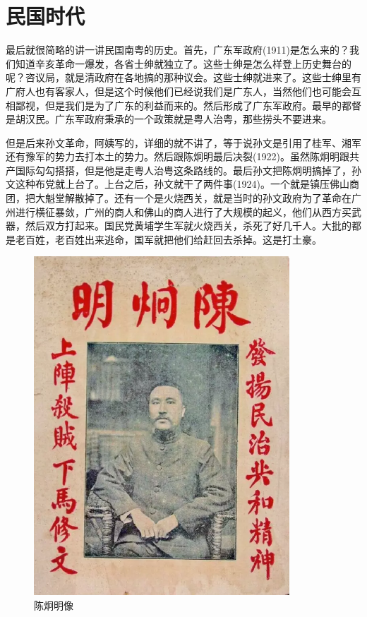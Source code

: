 \section{民国时代}

最后就很简略的讲一讲民国南粤的历史。首先，广东军政府(1911)是怎么来的？我们知道辛亥革命一爆发，各省士绅就独立了。这些士绅是怎么样登上历史舞台的呢？咨议局，就是清政府在各地搞的那种议会。这些士绅就进来了。这些士绅里有广府人也有客家人，但是这个时候他们已经说我们是广东人，当然他们也可能会互相鄙视，但是我们是为了广东的利益而来的。然后形成了广东军政府。最早的都督是胡汉民。广东军政府秉承的一个政策就是粤人治粤，那些捞头不要进来。

但是后来孙文革命，阿姨写的，详细的就不讲了，等于说孙文是引用了桂军、湘军还有豫军的势力去打本土的势力。然后跟陈炯明最后决裂(1922)。虽然陈炯明跟共产国际勾勾搭搭，但是他是走粤人治粤这条路线的。最后孙文把陈炯明搞掉了，孙文这种布党就上台了。上台之后，孙文就干了两件事(1924)。一个就是镇压佛山商团，把大魁堂解散掉了。还有一个是火烧西关，就是当时的孙文政府为了革命在广州进行横征暴敛，广州的商人和佛山的商人进行了大规模的起义，他们从西方买武器，然后双方打起来。国民党黄埔学生军就火烧西关，杀死了好几千人。大批的都是老百姓，老百姓出来逃命，国军就把他们给赶回去杀掉。这是打土豪。

\begin{figure}
	\centering
	\includegraphics[width=\textwidth]{images/image-78}
	\caption{陈炯明像}
\end{figure}

